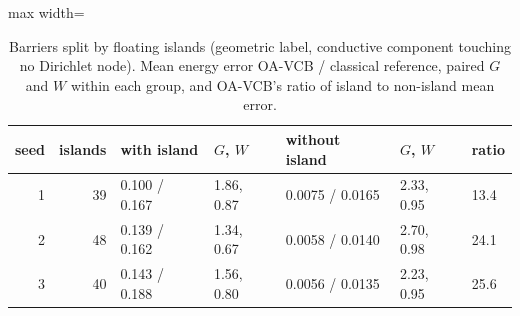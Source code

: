\begin{table}[tbp]\centering\footnotesize\setlength{\tabcolsep}{4pt}
\caption{Barriers split by floating islands (geometric label, conductive component touching no Dirichlet node). Mean energy error OA-VCB / classical reference, paired $G$ and $W$ within each group, and OA-VCB's ratio of island to non-island mean error.}\label{tab:islands}
\begin{adjustbox}{max width=\linewidth}
\begin{tabular}{rrlllll}\toprule
seed & islands & with island & $G$, $W$ & without island & $G$, $W$ & ratio \\\midrule
1 & 39 & 0.100 / 0.167 & 1.86, 0.87 & 0.0075 / 0.0165 & 2.33, 0.95 & 13.4 \\
2 & 48 & 0.139 / 0.162 & 1.34, 0.67 & 0.0058 / 0.0140 & 2.70, 0.98 & 24.1 \\
3 & 40 & 0.143 / 0.188 & 1.56, 0.80 & 0.0056 / 0.0135 & 2.23, 0.95 & 25.6 \\
\bottomrule\end{tabular}
\end{adjustbox}
\end{table}
